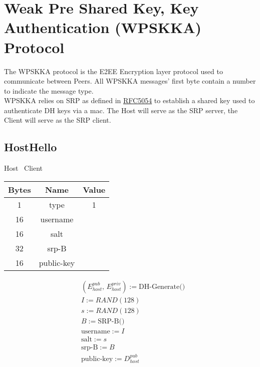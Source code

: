\section{Weak Pre Shared Key, Key Authentication (WPSKKA) Protocol}

The WPSKKA protocol is the E2EE Encryption layer protocol used to communicate between Peers. All WPSKKA messages'
first byte contain a number to indicate
the message type.\\

WPSKKA relies on SRP as defined in \href{https://datatracker.ietf.org/doc/html/rfc5054}{RFC5054} to establish a
shared key used to authenticate DH keys via a mac. The Host will serve as the SRP server, the Client will serve as the SRP
client.\\

\subsection{HostHello}

\begin{center}
    Host \textrightarrow\ Client\\
    \begin{tabular}{|c|c|c|}
        \hline
        \textbf{Bytes} & \textbf{Name} & \textbf{Value} \\
        \hline
        1              & type          & 1              \\
        \hline
        16             & username      &                \\
        \hline
        16             & salt          &                \\
        \hline
        32            & srp-B         &                \\
        \hline
        16             & public-key    &                \\
        \hline
    \end{tabular}
\end{center}

\begin{align*}
    & (E_{host}^{pub},\, E_{host}^{priv}) := \text{DH-Generate()}\\
    & I := RAND(128)\\
    & s := RAND(128)\\
    & B := \text{SRP-B()}\\
    & \text{username} := I\\
    & \text{salt} := s\\
    & \text{srp-B} := B\\
    & \text{public-key} := D_{host}^{pub}\\
\end{align*}

